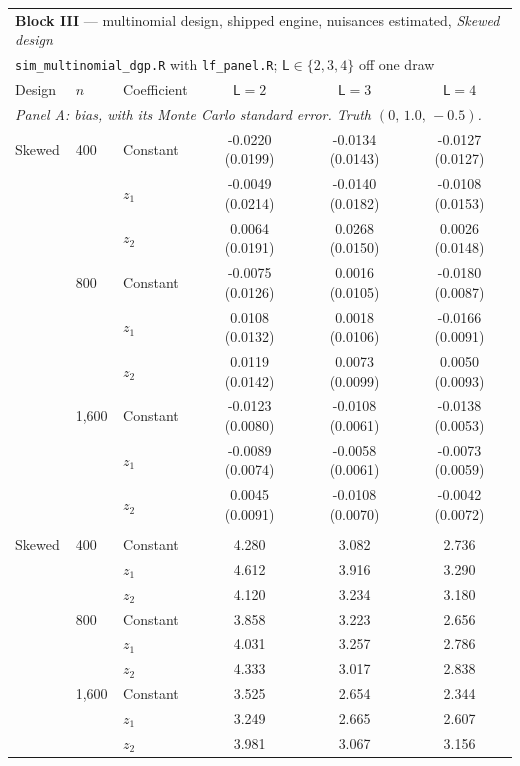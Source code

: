 \begin{tabular}{lllccc}
\toprule
\multicolumn{6}{l}{\textbf{Block III} --- multinomial design, shipped engine, nuisances estimated, \emph{Skewed design}} \\
\multicolumn{6}{l}{\quad \texttt{sim\_multinomial\_dgp.R} with \texttt{lf\_panel.R}; $\mathsf L\in\{2,3,4\}$ off one draw} \\
\midrule
Design & $n$ & Coefficient & $\mathsf L=2$ & $\mathsf L=3$ & $\mathsf L=4$ \\
\midrule
\multicolumn{6}{l}{\textit{Panel A: bias, with its Monte Carlo standard error.  Truth $(0,\,1.0,\,-0.5)$.}} \\
\midrule
Skewed & 400 & Constant & -0.0220 (0.0199) & -0.0134 (0.0143) & -0.0127 (0.0127) \\
 &  & $z_1$ & -0.0049 (0.0214) & -0.0140 (0.0182) & -0.0108 (0.0153) \\
 &  & $z_2$ & 0.0064 (0.0191) & 0.0268 (0.0150) & 0.0026 (0.0148) \\
 & 800 & Constant & -0.0075 (0.0126) & 0.0016 (0.0105) & -0.0180 (0.0087) \\
 &  & $z_1$ & 0.0108 (0.0132) & 0.0018 (0.0106) & -0.0166 (0.0091) \\
 &  & $z_2$ & 0.0119 (0.0142) & 0.0073 (0.0099) & 0.0050 (0.0093) \\
 & 1,600 & Constant & -0.0123 (0.0080) & -0.0108 (0.0061) & -0.0138 (0.0053) \\
 &  & $z_1$ & -0.0089 (0.0074) & -0.0058 (0.0061) & -0.0073 (0.0059) \\
 &  & $z_2$ & 0.0045 (0.0091) & -0.0108 (0.0070) & -0.0042 (0.0072) \\
\addlinespace
\multicolumn{6}{l}{\textit{Panel B: $\sqrt n\times$ s.d., which the theorem makes constant in $n$.}} \\
\midrule
Skewed & 400 & Constant & 4.280 & 3.082 & 2.736 \\
 &  & $z_1$ & 4.612 & 3.916 & 3.290 \\
 &  & $z_2$ & 4.120 & 3.234 & 3.180 \\
 & 800 & Constant & 3.858 & 3.223 & 2.656 \\
 &  & $z_1$ & 4.031 & 3.257 & 2.786 \\
 &  & $z_2$ & 4.333 & 3.017 & 2.838 \\
 & 1,600 & Constant & 3.525 & 2.654 & 2.344 \\
 &  & $z_1$ & 3.249 & 2.665 & 2.607 \\
 &  & $z_2$ & 3.981 & 3.067 & 3.156 \\

\end{tabular}
